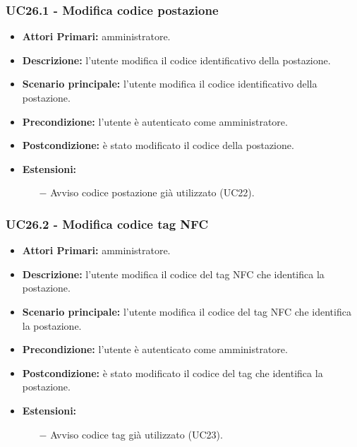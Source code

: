 \subsubsection{ UC26.1 - Modifica codice postazione}
\begin{itemize}
	\item\textbf{Attori Primari:}
	amministratore.
	\item\textbf{Descrizione:}
	l'utente modifica il codice identificativo della postazione.
	\item\textbf{Scenario principale:} 
	l'utente modifica il codice identificativo della postazione.
	\item\textbf{Precondizione:} 
	l'utente è autenticato come amministratore.
	\item\textbf{Postcondizione:}
	è stato modificato il codice della postazione.
	\item\textbf{Estensioni:}
	\begin{itemize}
		\item[$-$] Avviso codice postazione già utilizzato (UC22).
	\end{itemize}
\end{itemize}

\subsubsection{ UC26.2 - Modifica codice tag NFC}
\begin{itemize}
	\item\textbf{Attori Primari:}
	amministratore.
	\item\textbf{Descrizione:}
	l'utente modifica il codice del tag NFC che identifica la postazione.
	\item\textbf{Scenario principale:} 
	l'utente modifica il codice del tag NFC che identifica la postazione.
	\item\textbf{Precondizione:} 
	l'utente è autenticato come amministratore.
	\item\textbf{Postcondizione:}
	è stato modificato il codice del tag che identifica la postazione.
	\item\textbf{Estensioni:}
	\begin{itemize}
		\item[$-$] Avviso codice tag già utilizzato (UC23).
	\end{itemize}
\end{itemize}

